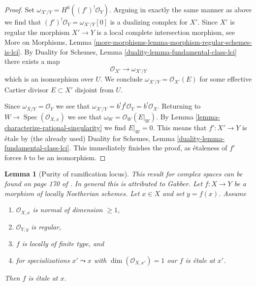 \documentclass{stacks-project}
\newenvironment{reference}{\comment}{\endcomment}
\theoremstyle{plain}
\newtheorem{lemma}[subsection]{Lemma}
\theoremstyle{definition}
\theoremstyle{remark}
\numberwithin{equation}{subsection}
\def\Spec{\mathop{\mathrm{Spec}}}
\begin{document}
\begin{proof}
\medskip\noindent
Set $\omega_{X'/Y} = H^0((f')^!\mathcal{O}_Y)$. Arguing in exactly the
same manner as above we find that $(f')^!\mathcal{O}_Y = \omega_{X'/Y}[0]$
is a dualizing complex for $X'$. Since $X'$ is regular
the morphism $X' \to Y$ is a local complete intersection morphism, see
More on Morphisms, Lemma
\ref{more-morphisms-lemma-morphism-regular-schemes-is-lci}.
By Duality for Schemes, Lemma \ref{duality-lemma-fundamental-class-lci}
there exists a map
$$
\mathcal{O}_{X'} \longrightarrow \omega_{X'/Y}
$$
which is an isomorphism over $U$. We conclude
$\omega_{X'/Y} = \mathcal{O}_{X'}(E)$ for some effective
Cartier divisor $E \subset X'$ disjoint from $U$.

\medskip\noindent
Since $\omega_{X/Y} = \mathcal{O}_Y$ we see that
$\omega_{X'/Y} = b^! f^!\mathcal{O}_Y = b^!\mathcal{O}_X$.
Returning to $W \to \Spec(\mathcal{O}_{X, x})$
we see that $\omega_W = \mathcal{O}_W(E|_W)$.
By Lemma \ref{lemma-characterize-rational-singularity}
we find $E|_W = 0$.
This means that $f' : X' \to Y$ is \'etale by (the already used)
Duality for Schemes, Lemma \ref{duality-lemma-fundamental-class-lci}.
This immediately finishes the proof, as \'etaleness
of $f'$ forces $b$ to be an isomorphism.
\end{proof}

\begin{lemma}[Purity of ramification locus]
\label{lemma-purity-ramification}
\begin{reference}
This result for complex spaces can be found on page 170 of \cite{Fischer}.
In general this is \cite[Theorem 2.4]{Zong} attributed to Gabber.
\end{reference}
Let $f : X \to Y$ be a morphism of locally Noetherian schemes.
Let $x \in X$ and set $y = f(x)$. Assume
\begin{enumerate}
\item $\mathcal{O}_{X, x}$ is normal of dimension $\geq 1$,
\item $\mathcal{O}_{Y, y}$ is regular,
\item $f$ is locally of finite type, and
\item for specializations $x' \leadsto x$ with
$\dim(\mathcal{O}_{X, x'}) = 1$ our $f$ is \'etale at $x'$.
\end{enumerate}
Then $f$ is \'etale at $x$.
\end{lemma}
\end{document}
